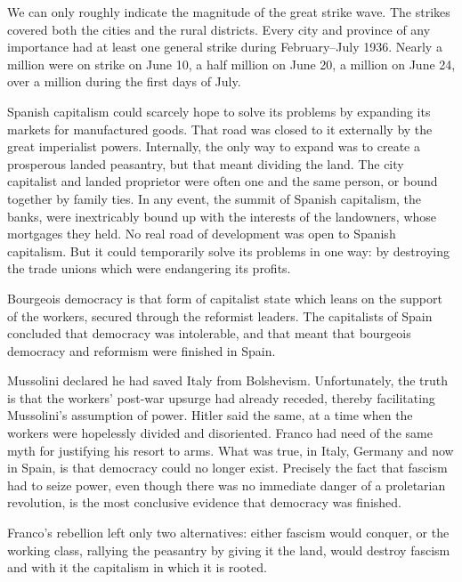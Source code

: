 We can only roughly indicate the magnitude of the great strike wave. The strikes covered both the cities and the rural districts. Every city and province of any importance had at least one general strike during February--July 1936. Nearly a million were on strike on June 10, a half million on June 20, a million on June 24, over a million during the first days of July.

Spanish capitalism could scarcely hope to solve its problems by expanding its markets for manufactured goods. That road was closed to it externally by the great imperialist powers. Internally, the only way to expand was to create a prosperous landed peasantry, but that meant dividing the land. The city capitalist and landed proprietor were often one and the same person, or bound together by family ties. In any event, the summit of Spanish capitalism, the banks, were inextricably bound up with the interests of the landowners, whose mortgages they held. No real road of development was open to Spanish capitalism. But it could temporarily solve its problems in one way: by destroying the trade unions which were endangering its profits.

Bourgeois democracy is that form of capitalist state which leans on the support of the workers, secured through the reformist leaders. The capitalists of Spain concluded that democracy was intolerable, and that meant that bourgeois democracy and reformism were finished in Spain.

Mussolini declared he had saved Italy from Bolshevism. Unfortunately, the truth is that the workers’ post-war upsurge had already receded, thereby facilitating Mussolini’s assumption of power. Hitler said the same, at a time when the workers were hopelessly divided and disoriented. Franco had need of the same myth for justifying his resort to arms. What was true, in Italy, Germany and now in Spain, is that democracy could no longer exist. Precisely the fact that fascism had to seize power, even though there was no immediate danger of a proletarian revolution, is the most conclusive evidence that democracy was finished.

Franco’s rebellion left only two alternatives: either fascism would conquer, or the working class, rallying the peasantry by giving it the land, would destroy fascism and with it the capitalism in which it is rooted.

